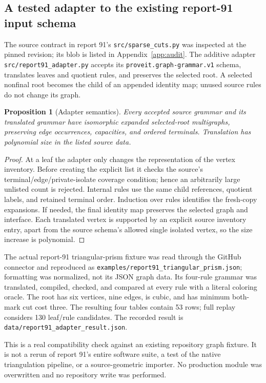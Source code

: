 \documentclass[11pt,letterpaper]{article}
\newtheorem{proposition}[theorem]{Proposition}
\theoremstyle{definition}
\theoremstyle{remark}\newtheorem{remark}[theorem]{Remark}
\DeclareRobustCommand{\code}[1]{\nolinkurl{#1}}
\begin{document}
\subsection{A tested adapter to the existing report-91 input schema}
The source contract in report 91's \code{src/sparse_cuts.py} was inspected at the pinned revision; its blob is listed in Appendix~\ref{app:audit}. The additive adapter \code{src/report91_adapter.py} accepts its \code{proveit.graph-grammar.v1} schema, translates leaves and quotient rules, and preserves the selected root. A selected nonfinal root becomes the child of an appended identity map; unused source rules do not change its graph.

\begin{proposition}[Adapter semantics]\label{prop:adapter}
Every accepted source grammar and its translated grammar have isomorphic expanded selected-root multigraphs, preserving edge occurrences, capacities, and ordered terminals. Translation has polynomial size in the listed source data.
\end{proposition}
\begin{proof}
At a leaf the adapter only changes the representation of the vertex inventory. Before creating the explicit list it checks the source's terminal/edge/private-isolate coverage condition; hence an arbitrarily large unlisted count is rejected. Internal rules use the same child references, quotient labels, and retained terminal order. Induction over rules identifies the fresh-copy expansions. If needed, the final identity map preserves the selected graph and interface. Each translated vertex is supported by an explicit source inventory entry, apart from the source schema's allowed single isolated vertex, so the size increase is polynomial.
\end{proof}

The actual report-91 triangular-prism fixture was read through the GitHub connector and reproduced as \code{examples/report91_triangular_prism.json}; formatting was normalized, not its JSON graph data. Its four-rule grammar was translated, compiled, checked, and compared at every rule with a literal coloring oracle. The root has six vertices, nine edges, is cubic, and has minimum both-mark cut cost three. The resulting four tables contain 53 rows; full replay considers 130 leaf/rule candidates. The recorded result is \code{data/report91_adapter_result.json}.

This is a real compatibility check against an existing repository graph fixture. It is not a rerun of report 91's entire software suite, a test of the native triangulation pipeline, or a source-geometric importer. No production module was overwritten and no repository write was performed.
\end{document}
